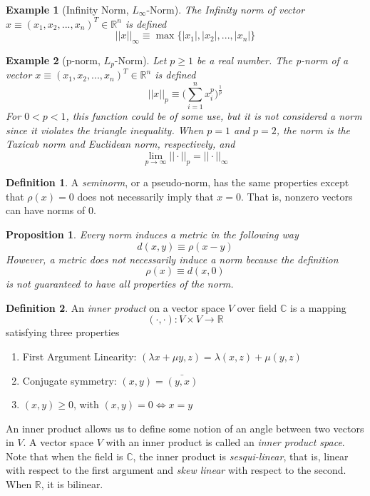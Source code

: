 \documentclass{article}
\newtheorem{proposition}[theorem]{Proposition}
\newtheorem{example}{Example}[section]
\theoremstyle{remark}
\theoremstyle{definition}
\newtheorem{definition}{Definition}[section]
\begin{document}
\begin{example}[Infinity Norm, $L_\infty$-Norm]
The Infinity norm of vector $x \equiv (x_1, x_2, ..., x_n)^T \in \mathbb{R}^n$ is defined
\[ ||x||_\infty \equiv \max{\{|x_1|, |x_2|, ..., |x_n|\}}\]
\end{example}

\begin{example}[p-norm, $L_p$-Norm]
Let $p\geq 1$ be a real number. The p-norm of a vector $x \equiv (x_1, x_2, ..., x_n)^T \in \mathbb{R}^n$ is defined
\[ ||x||_p \equiv \bigg( \sum_{i=1}^n x_i^p \bigg)^{\frac{1}{p}}\]
For $0<p<1$, this function could be of some use, but it is not considered a norm since it violates the triangle inequality. When $p = 1$ and $p =2$, the norm is the Taxicab norm and Euclidean norm, respectively, and 
\[ \lim_{p \rightarrow \infty} ||\cdot||_p = ||\cdot||_\infty\]
\end{example}

\begin{definition}
A \textit{seminorm}, or a pseudo-norm, has the same properties except that $\rho(x) = 0$ does not necessarily imply that $x = 0$. That is, nonzero vectors can have norms of $0$. 
\end{definition}

\begin{proposition}
Every norm induces a metric in the following way
\[ d(x, y) \equiv \rho(x-y)\]
However, a metric does not necessarily induce a norm because the definition
\[\rho(x) \equiv d(x, 0)\]
is not guaranteed to have all properties of the norm. 
\end{proposition}

\begin{definition}
An \textit{inner product} on a vector space $V$ over field $\mathbb{C}$ is a mapping 
\[(\cdot, \cdot): V \times V \longrightarrow \mathbb{R}\]
satisfying three properties 
\begin{enumerate}
    \item First Argument Linearity: $(\lambda x + \mu y, z) = \lambda (x, z) + \mu (y, z)$
    \item Conjugate symmetry: $(x, y) = \bar{(y, x)}$
    \item $(x, y) \geq 0$, with $(x, y) = 0 \iff x = y$
\end{enumerate}
An inner product allows us to define some notion of an angle between two vectors in $V$. A vector space $V$ with an inner product is called an \textit{inner product space}. Note that when the field is $\mathbb{C}$, the inner product is \textit{sesqui-linear}, that is, linear with respect to the first argument and \textit{skew linear} with respect to the second. When $\mathbb{R}$, it is bilinear. 
\end{definition}
\end{document}
